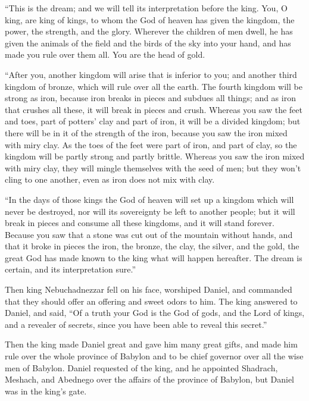  ``This is the dream; and we will tell its interpretation
before the king.  You, O king, are king of kings, to whom
the God of heaven has given the kingdom, the power, the strength, and
the glory.  Wherever the children of men dwell, he has
given the animals of the field and the birds of the sky into your hand,
and has made you rule over them all. You are the head of gold.

 ``After you, another kingdom will arise that is inferior
to you; and another third kingdom of bronze, which will rule over all
the earth.  The fourth kingdom will be strong as iron,
because iron breaks in pieces and subdues all things; and as iron that
crushes all these, it will break in pieces and crush. 
Whereas you saw the feet and toes, part of potters' clay and part of
iron, it will be a divided kingdom; but there will be in it of the
strength of the iron, because you saw the iron mixed with miry clay.
 As the toes of the feet were part of iron, and part of
clay, so the kingdom will be partly strong and partly brittle.
 Whereas you saw the iron mixed with miry clay, they will
mingle themselves with the seed of men; but they won't cling to one
another, even as iron does not mix with clay.

 ``In the days of those kings the God of heaven will set up
a kingdom which will never be destroyed, nor will its sovereignty be
left to another people; but it will break in pieces and consume all
these kingdoms, and it will stand forever.  Because you saw
that a stone was cut out of the mountain without hands, and that it
broke in pieces the iron, the bronze, the clay, the silver, and the
gold, the great God has made known to the king what will happen
hereafter. The dream is certain, and its interpretation sure.''

 Then king Nebuchadnezzar fell on his face, worshiped
Daniel, and commanded that they should offer an offering and sweet odors
to him.  The king answered to Daniel, and said, ``Of a
truth your God is the God of gods, and the Lord of kings, and a revealer
of secrets, since you have been able to reveal this secret.''

 Then the king made Daniel great and gave him many great
gifts, and made him rule over the whole province of Babylon and to be
chief governor over all the wise men of Babylon.  Daniel
requested of the king, and he appointed Shadrach, Meshach, and Abednego
over the affairs of the province of Babylon, but Daniel was in the
king's gate.

